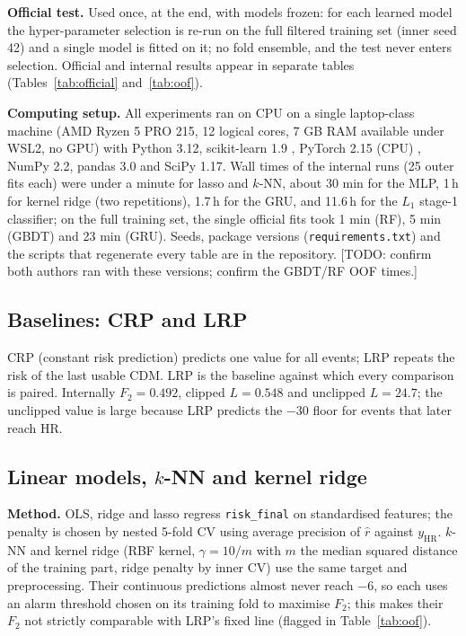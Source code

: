 \documentclass[clean,twocolumn]{bam-proposal}
\newcommand{\todo}[1]{{\color{red}[TODO: #1]}}
\newcommand{\HR}{\mathrm{HR}}
\begin{document}
\textbf{Official test.} Used once, at the end, with models frozen: for each learned model the hyper-parameter selection is re-run on the full filtered training set (inner seed 42) and a single model is fitted on it; no fold ensemble, and the test never enters selection. Official and internal results appear in separate tables (Tables~\ref{tab:official} and~\ref{tab:oof}).

\textbf{Computing setup.} All experiments ran on CPU on a single laptop-class machine (AMD Ryzen 5 PRO 215, 12 logical cores, 7 GB RAM available under WSL2, no GPU) with Python 3.12, scikit-learn 1.9 \citep{pedregosa2011sklearn}, PyTorch 2.15 (CPU) \citep{paszke2019pytorch}, NumPy 2.2, pandas 3.0 and SciPy 1.17. Wall times of the internal runs (25 outer fits each) were under a minute for lasso and $k$-NN, about 30 min for the MLP, 1\,h for kernel ridge (two repetitions), 1.7\,h for the GRU, and 11.6\,h for the $L_1$ stage-1 classifier; on the full training set, the single official fits took 1 min (RF), 5 min (GBDT) and 23 min (GRU). Seeds, package versions (\texttt{requirements.txt}) and the scripts that regenerate every table are in the repository. \todo{confirm both authors ran with these versions; confirm the GBDT/RF OOF times.}

\subsection{Baselines: CRP and LRP}
CRP (constant risk prediction) predicts one value for all events; LRP repeats the risk of the last usable CDM. LRP is the baseline against which every comparison is paired. Internally $F_2=0.492$, clipped $L=0.548$ and unclipped $L=24.7$; the unclipped value is large because LRP predicts the $-30$ floor for events that later reach HR.

\subsection{Linear models, $k$-NN and kernel ridge}
\textbf{Method.} OLS, ridge \citep{hoerl1970ridge} and lasso \citep{tibshirani1996lasso} regress \texttt{risk\_final} on standardised features; the penalty is chosen by nested 5-fold CV using average precision of $\hat r$ against $y_{\HR}$. $k$-NN and kernel ridge (RBF kernel, $\gamma=10/m$ with $m$ the median squared distance of the training part, ridge penalty by inner CV) use the same target and preprocessing. Their continuous predictions almost never reach $-6$, so each uses an alarm threshold chosen on its training fold to maximise $F_2$; this makes their $F_2$ not strictly comparable with LRP's fixed line (flagged in Table~\ref{tab:oof}).
\end{document}
